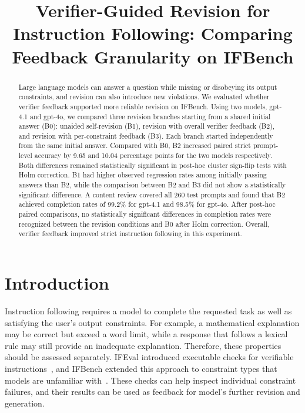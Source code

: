 \documentclass[conference]{IEEEtran}
\begin{document}
\title{Verifier-Guided Revision for Instruction Following: Comparing Feedback Granularity on IFBench}
\author{
}
\maketitle
\thispagestyle{plain}
\pagestyle{plain}

\begin{abstract}
Large language models can answer a question while missing or disobeying its output constraints, and revision can also introduce new violations. We evaluated whether verifier feedback supported more reliable revision on IFBench. Using two models, gpt-4.1 and gpt-4o, we compared three revision branches starting from a shared initial answer (B0): unaided self-revision (B1), revision with overall verifier feedback (B2), and revision with per-constraint feedback (B3). Each branch started independently from the same initial answer. Compared with B0, B2 increased paired strict prompt-level accuracy by 9.65 and 10.04 percentage points for the two models respectively. Both differences remained statistically significant in post-hoc cluster sign-flip tests with Holm correction. B1 had higher observed regression rates among initially passing answers than B2, while the comparison between B2 and B3 did not show a statistically significant difference. A content review covered all 260 test prompts and found that B2 achieved completion rates of 99.2\% for gpt-4.1 and 98.5\% for gpt-4o. After post-hoc paired comparisons, no statistically significant differences in completion rates were recognized between the revision conditions and B0 after Holm correction. Overall, verifier feedback improved strict instruction following in this experiment.
\end{abstract}

\section{Introduction}
Instruction following requires a model to complete the requested task as well as satisfying the user's output constraints. For example, a mathematical explanation may be correct but exceed a word limit, while a response that follows a lexical rule may still provide an inadequate explanation. Therefore, these properties should be assessed separately. IFEval introduced executable checks for verifiable instructions~\cite{zhou2023ifeval}, and IFBench extended this approach to constraint types that models are unfamiliar with~\cite{pyatkin2025ifbench}. These checks can help inspect individual constraint failures, and their results can be used as feedback for model's further revision and generation.
\end{document}
